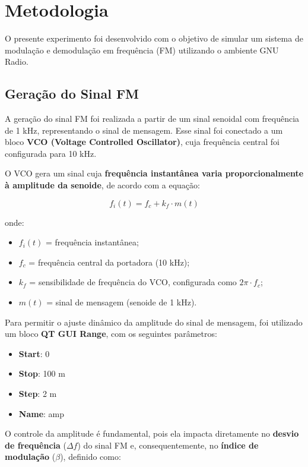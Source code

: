 \section{Metodologia}

O presente experimento foi desenvolvido com o objetivo de simular um sistema de modulação e demodulação em frequência (FM) utilizando o ambiente GNU Radio.

\subsection{Geração do Sinal FM}

A geração do sinal FM foi realizada a partir de um sinal senoidal com frequência de 1 kHz, representando o sinal de mensagem. Esse sinal foi conectado a um bloco \textbf{VCO (Voltage Controlled Oscillator)}, cuja frequência central foi configurada para 10 kHz.

O VCO gera um sinal cuja \textbf{frequência instantânea varia proporcionalmente à amplitude da senoide}, de acordo com a equação:

\begin{equation}
f_i(t) = f_c + k_f \cdot m(t)
\end{equation}

onde:
\begin{itemize}
    \item $f_i(t)$ = frequência instantânea;
    \item $f_c$ = frequência central da portadora (10 kHz);
    \item $k_f$ = sensibilidade de frequência do VCO, configurada como $2\pi \cdot f_c$;
    \item $m(t)$ = sinal de mensagem (senoide de 1 kHz).
\end{itemize}

Para permitir o ajuste dinâmico da amplitude do sinal de mensagem, foi utilizado um bloco \textbf{QT GUI Range}, com os seguintes parâmetros:
\begin{itemize}
    \item \textbf{Start}: 0
    \item \textbf{Stop}: 100 m
    \item \textbf{Step}: 2 m
    \item \textbf{Name}: amp
\end{itemize}

O controle da amplitude é fundamental, pois ela impacta diretamente no \textbf{desvio de frequência} ($\Delta f$) do sinal FM e, consequentemente, no \textbf{índice de modulação} ($\beta$), definido como:

